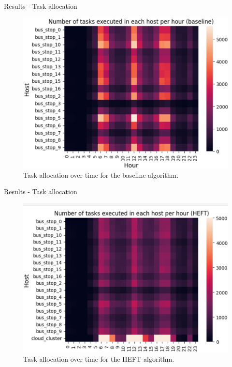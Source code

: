 \documentclass[Ligatures=TeX,table,svgnames,usetotalslideindicator,compress,10pt,aspectratio=169]{beamer}
\begin{document}
\begin{frame}{Results - Task allocation}

   \begin{figure}[!h]
        \centering
        \includegraphics[width=.7\linewidth]{images/baseline.png}
        \caption{Task allocation over time for the baseline algorithm.}
      \end{figure}

\end{frame}

\begin{frame}{Results - Task allocation}

   \begin{figure}[!h]
        \centering
        \includegraphics[width=.7\linewidth]{images/heft.png}
        \caption{Task allocation over time for the HEFT algorithm.}
      \end{figure}

\end{frame}
\end{document}

